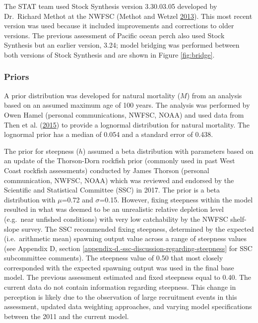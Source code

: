 \documentclass[12pt,]{article}
\begin{document}
The STAT team used Stock Synthesis version 3.30.03.05 developed by
Dr.~Richard Methot at the NWFSC (Methot and Wetzel
\protect\hyperlink{ref-methot_stock_2013}{2013}). This most recent
version was used because it included improvements and corrections to
older versions. The previous assessment of Pacific ocean perch also used
Stock Synthesis but an earlier version, 3.24; model bridging was
performed between both versions of Stock Synthesis and are shown in
Figure \ref{fig:bridge}.

\subsubsection{Priors}\label{priors}

A prior distribution was developed for natural mortality (\(M\)) from an
analysis based on an assumed maximum age of 100 years. The analysis was
performed by Owen Hamel (personal communications, NWFSC, NOAA) and used
data from Then et al.
(\protect\hyperlink{ref-then_evaluating_2015}{2015}) to provide a
lognormal distribution for natural mortality. The lognormal prior has a
median of 0.054 and a standard error of 0.438.

The prior for steepness (\(h\)) assumed a beta distribution with
parameters based on an update of the Thorson-Dorn rockfish prior
(commonly used in past West Coast rockfish assessments) conducted by
James Thorson (personal communication, NWFSC, NOAA) which was reviewed
and endorsed by the Scientific and Statistical Committee (SSC) in 2017.
The prior is a beta distribution with \(\mu\)=0.72 and \(\sigma\)=0.15.
However, fixing steepness within the model resulted in what was deemed
to be an unrealistic relative depletion level (e.g.~near unfished
conditions) with very low catchability by the NWFSC shelf-slope survey.
The SSC recommended fixing steepness, determined by the expected
(i.e.~arithmetic mean) spawning output value across a range of steepness
values (see Appendix D, section
\ref{appendix-d.-ssc-discussion-regarding-steepness} for SSC
subcommittee comments). The steepness value of 0.50 that most closely
corresponded with the expected spawning output was used in the final
base model. The previous assessment estimated and fixed steepness equal
to 0.40. The current data do not contain information regarding
steepness. This change in perception is likely due to the observation of
large recruitment events in this assessment, updated data weighting
approaches, and varying model specifications between the 2011 and the
current model.
\end{document}
